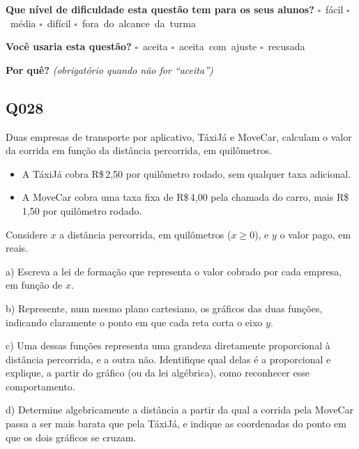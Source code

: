 \documentclass[11pt,a4paper]{article}
\begin{document}
\textbf{Que nível de dificuldade esta questão tem para os seus alunos?}\quad
\mbox{$\square$~fácil} \quad \mbox{$\square$~média} \quad
\mbox{$\square$~difícil} \quad \mbox{$\square$~fora do alcance da turma}

\textbf{Você usaria esta questão?}\quad
\mbox{$\square$~aceita} \quad \mbox{$\square$~aceita com ajuste} \quad
\mbox{$\square$~recusada}

\textbf{Por quê?} \emph{(obrigatório quando não for ``aceita'')}

\underline{\hspace{\linewidth}}

\underline{\hspace{\linewidth}}
\vspace{0.6em}

\begin{samepage}
\subsection*{Q028}
Duas empresas de transporte por aplicativo, TáxiJá e MoveCar, calculam o valor da corrida em função da distância percorrida, em quilômetros.

\begin{itemize}[nosep,leftmargin=*]
\item A TáxiJá cobra R\$\,2,50 por quilômetro rodado, sem qualquer taxa adicional.
\item A MoveCar cobra uma taxa fixa de R\$\,4,00 pela chamada do carro, mais R\$\,1,50 por quilômetro rodado.
\end{itemize}

Considere $x$ a distância percorrida, em quilômetros ($x \geq 0$), e $y$ o valor pago, em reais.

a) Escreva a lei de formação que representa o valor cobrado por cada empresa, em função de $x$.

b) Represente, num mesmo plano cartesiano, os gráficos das duas funções, indicando claramente o ponto em que cada reta corta o eixo $y$.

c) Uma dessas funções representa uma grandeza diretamente proporcional à distância percorrida, e a outra não. Identifique qual delas é a proporcional e explique, a partir do gráfico (ou da lei algébrica), como reconhecer esse comportamento.

d) Determine algebricamente a distância a partir da qual a corrida pela MoveCar passa a ser mais barata que pela TáxiJá, e indique as coordenadas do ponto em que os dois gráficos se cruzam.


\end{samepage}
\end{document}
